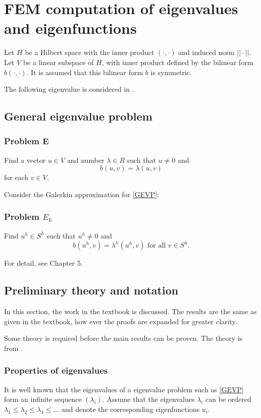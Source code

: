 \documentclass[../../main.tex]{subfiles}
\begin{document}
\section{FEM computation of eigenvalues and eigenfunctions}
Let $H$ be a Hilbert space with the inner product $(\cdot,\cdot)$ and induced norm $||\cdot||$. Let $V$ be a linear subspace of $H$, with inner product defined by the bilinear form $b(\cdot,\cdot)$. It is assumed that this bilinear form $b$ is symmetric.

The following eigenvalue is considered in \cite{SF73}.

\subsection{General eigenvalue problem}
\subsubsection*{Problem E}
Find a vector $u \in V$ and number $\lambda \in R$ such that $u \neq 0$ and
\begin{equation}
	b(u,v) = \lambda (u,v) \label{GEVP}
\end{equation} for each $v \in V$.

Consider the Galerkin approximation for \eqref{GEVP}:
\subsubsection*{Problem $E_h$}
Find $u^h \in S^h$ such that $u^h \neq 0$ and \[b(u^h, v) = \lambda^h(u^h,v) \textrm{ for all } v \in S^h.\] 

For detail, see Chapter 5.

\subsection{Preliminary theory and notation}
In this section, the work in the textbook \cite[p.228-236]{SF73} is discussed. The results are the same as given in the textbook, how ever the proofs are expanded for greater clarity.

Some theory is required before the main results can be proven. The theory is from \cite{SF73}.

\subsubsection*{Properties of eigenvalues}
It is well known that the eigenvalues of a eigenvalue problem such as \eqref{GEVP} form an infinite sequence $(\lambda_i)$. Assume that the eigenvalues $\lambda_i$ can be ordered $\lambda_1 \leq \lambda_2 \leq \lambda_3 \leq ...$ and denote the corresponding eigenfunctions $u_i$.
\end{document}

